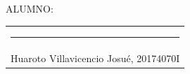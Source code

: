 \documentclass[a4paper,11pt]{report}
\begin{document}
\begin{flushleft}
{\large ALUMNO:}\\[2cm]
\end{flushleft}
\begin{center}
\begin{tabular}{c}
\rule[1pt]{3.14in}{1pt}\\
Huaroto Villavicencio Josué, 20174070I \\[2.5cm]
\end{tabular}
\end{center}
\end{document}
